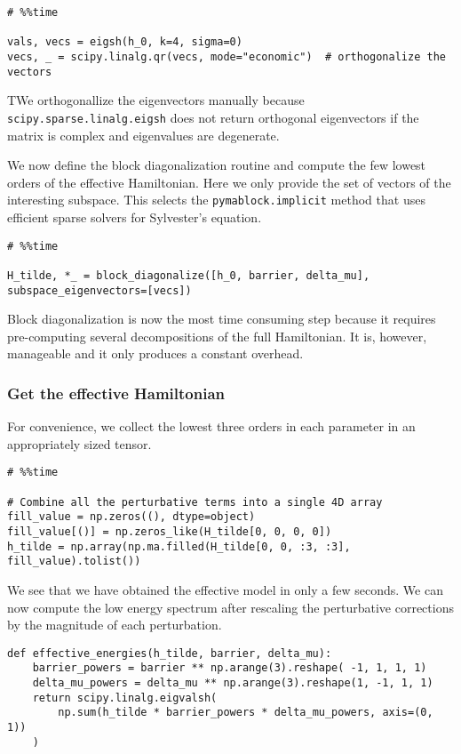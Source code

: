 \documentclass[submission, Codebases]{SciPost}
\begin{document}
{{\begin{verbatim}
# %%time

vals, vecs = eigsh(h_0, k=4, sigma=0)
vecs, _ = scipy.linalg.qr(vecs, mode="economic")  # orthogonalize the vectors
\end{verbatim}

TWe orthogonallize the eigenvectors manually because
\texttt{scipy.sparse.linalg.eigsh} does not return orthogonal eigenvectors if the
matrix is complex and eigenvalues are degenerate.

We now define the block diagonalization routine and compute the few lowest
orders of the effective Hamiltonian.
Here we only provide the set of vectors of the interesting subspace.
This selects the \texttt{pymablock.implicit} method that uses efficient sparse
solvers for Sylvester's equation.

\begin{verbatim}
# %%time

H_tilde, *_ = block_diagonalize([h_0, barrier, delta_mu], subspace_eigenvectors=[vecs])
\end{verbatim}

Block diagonalization is now the most time consuming step because it requires
pre-computing several decompositions of the full Hamiltonian.
It is, however, manageable and it only produces a constant overhead.

\subsubsection{Get the effective Hamiltonian}

For convenience, we collect the lowest three orders in each parameter in an
appropriately sized tensor.

\begin{verbatim}
# %%time

# Combine all the perturbative terms into a single 4D array
fill_value = np.zeros((), dtype=object)
fill_value[()] = np.zeros_like(H_tilde[0, 0, 0, 0])
h_tilde = np.array(np.ma.filled(H_tilde[0, 0, :3, :3], fill_value).tolist())
\end{verbatim}

We see that we have obtained the effective model in only a few seconds.
We can now compute the low energy spectrum after rescaling the perturbative
corrections by the magnitude of each perturbation.

\begin{verbatim}
def effective_energies(h_tilde, barrier, delta_mu):
    barrier_powers = barrier ** np.arange(3).reshape( -1, 1, 1, 1)
    delta_mu_powers = delta_mu ** np.arange(3).reshape(1, -1, 1, 1)
    return scipy.linalg.eigvalsh(
        np.sum(h_tilde * barrier_powers * delta_mu_powers, axis=(0, 1))
    )
\end{verbatim}

}}
\end{document}
